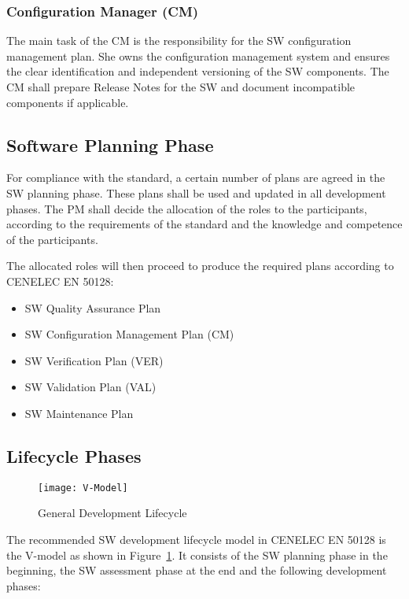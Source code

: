 \subsubsection{Configuration Manager (CM)}
\label{sec:conf-manag}

The main task of the CM is the responsibility for the SW configuration
management plan. She owns the configuration management system and ensures the
clear identification and independent versioning of the SW components. The CM
shall prepare Release Notes for the SW and document incompatible components if
applicable.

\subsection{Software Planning Phase}
\label{sec:documents--plan}

For compliance with the standard, a certain number of plans are agreed in the SW
planning phase. These plans shall be used and updated in all development
phases. The PM shall decide the allocation of the roles to the participants,
according to the requirements of the standard and the knowledge and competence
of the participants.

The allocated roles will then proceed to produce the required plans according to
CENELEC EN 50128:

\begin{itemize}
\item SW Quality Assurance Plan
\item SW Configuration Management Plan (CM)
\item SW Verification Plan (VER)
\item SW Validation Plan (VAL)
\item SW Maintenance Plan
\end{itemize}


\subsection{Lifecycle Phases}
\label{sec:lifecycle-phases}

\begin{figure}[ht]
  \centering
  \texttt{[image: V-Model]}
  \caption{General Development Lifecycle~\cite{EN-50128}}
  \label{fig:develop-lifecycle-cenelec}
\end{figure}

The recommended SW development lifecycle model in CENELEC EN 50128 is the
V-model as shown in Figure~\ref{fig:develop-lifecycle-cenelec}. It consists of
the SW planning phase in the beginning, the SW assessment phase at the end and
the following development phases:

